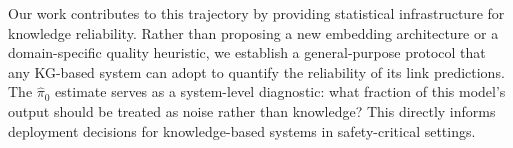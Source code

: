 Our work contributes to this trajectory by providing statistical infrastructure for knowledge reliability.
Rather than proposing a new embedding architecture or a domain-specific quality heuristic, we establish a general-purpose protocol that any KG-based system can adopt to quantify the reliability of its link predictions.
The $\hat{\pi}_0$ estimate serves as a system-level diagnostic: what fraction of this model's output should be treated as noise rather than knowledge?
This directly informs deployment decisions for knowledge-based systems in safety-critical settings.
